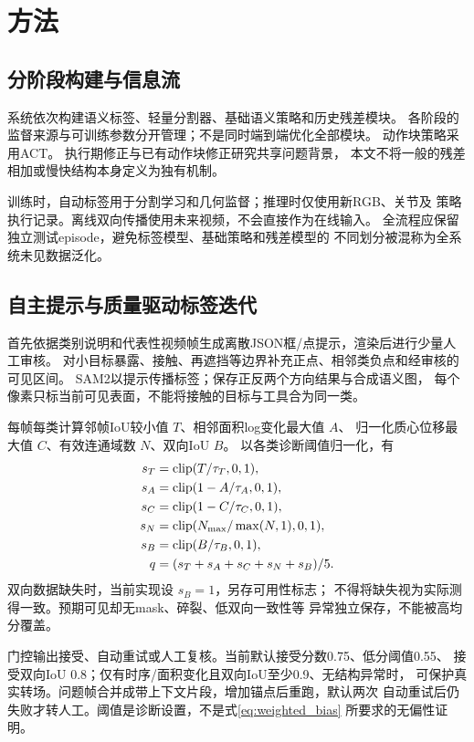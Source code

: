 \section{方法}
\label{sec:method}

\subsection{分阶段构建与信息流}

系统依次构建语义标签、轻量分割器、基础语义策略和历史残差模块。
各阶段的监督来源与可训练参数分开管理；不是同时端到端优化全部模块。
动作块策略采用ACT\cite{zhao2023act}。
执行期修正与已有动作块修正研究共享问题背景\cite{a2c2}，
本文不将一般的残差相加或慢快结构本身定义为独有机制。

训练时，自动标签用于分割学习和几何监督；推理时仅使用新RGB、关节及
策略执行记录。离线双向传播使用未来视频，不会直接作为在线输入。
全流程应保留独立测试episode，避免标签模型、基础策略和残差模型的
不同划分被混称为全系统未见数据泛化。

\subsection{自主提示与质量驱动标签迭代}

首先依据类别说明和代表性视频帧生成离散JSON框/点提示，渲染后进行少量人工审核。
对小目标暴露、接触、再遮挡等边界补充正点、相邻类负点和经审核的可见区间。
SAM2\cite{ravi2024sam2}以提示传播标签；保存正反两个方向结果与合成语义图，
每个像素只标当前可见表面，不能将接触的目标与工具合为同一类。

每帧每类计算邻帧IoU较小值 $T$、相邻面积log变化最大值 $A$、
归一化质心位移最大值 $C$、有效连通域数 $N$、双向IoU $B$。
以各类诊断阈值归一化，有
\begin{align}
 s_T&=\operatorname{clip}(T/\tau_T,0,1),\nonumber\\
 s_A&=\operatorname{clip}(1-A/\tau_A,0,1),\nonumber\\
 s_C&=\operatorname{clip}(1-C/\tau_C,0,1),\nonumber\\
 s_N&=\operatorname{clip}(N_{\max}/\max(N,1),0,1),\nonumber\\
 s_B&=\operatorname{clip}(B/\tau_B,0,1),\nonumber\\
 q&=(s_T+s_A+s_C+s_N+s_B)/5.
 \label{eq:quality}
\end{align}
双向数据缺失时，当前实现设 $s_B=1$，另存可用性标志；
不得将缺失视为实际测得一致。预期可见却无mask、碎裂、低双向一致性等
异常独立保存，不能被高均分覆盖。

门控输出接受、自动重试或人工复核。当前默认接受分数0.75、低分阈值0.55、
接受双向IoU 0.8；仅有时序/面积变化且双向IoU至少0.9、无结构异常时，
可保护真实转场。问题帧合并成带上下文片段，增加锚点后重跑，默认两次
自动重试后仍失败才转人工。阈值是诊断设置，不是式\eqref{eq:weighted_bias}
所要求的无偏性证明。

